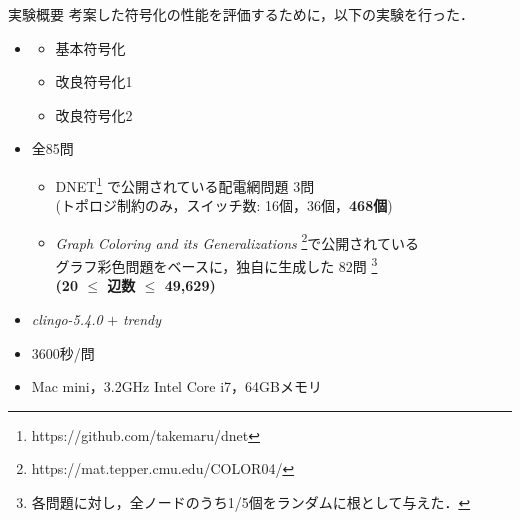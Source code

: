 \documentclass[dvipdfmx,11pt]{beamer}
\begin{document}
\begin{frame}{実験概要}
  \renewcommand{\thefootnote}{\fnsymbol{footnote}}
  \setcounter{footnote}{1}
  考案した符号化の性能を評価するために，以下の実験を行った．
  \begin{itemize}
  \item {}
    \begin{itemize}
	 \item 基本符号化
	 \item 改良符号化1
	 \item 改良符号化2
    \end{itemize}
  \item {} 全85問
    \begin{itemize}
    \item DNET\footnote{https://github.com/takemaru/dnet}%
      で公開されている配電網問題 3問 \\ (トポロジ制約のみ，スイッチ数:
      16個，36個，\alert{\bf 468個})
    \item \textit{Graph Coloring and its Generalizations}
      \footnote{https://mat.tepper.cmu.edu/COLOR04/}で公開されている \\
      グラフ彩色問題をベースに，独自に生成した 82問 
      \footnote{各問題に対し，全ノードのうち1/5個をランダムに根として与えた．}\\
      \alert{\bf (20 $\leq$ 辺数 $\leq$ 49,629)}
    \end{itemize}
  \item {} \textit{clingo-5.4.0} $+$ \textit{trendy}
  \item {} 3600秒/問
  \item {} Mac mini，3.2GHz Intel Core i7，64GBメモリ
  \end{itemize}
\end{frame}
\end{document}
